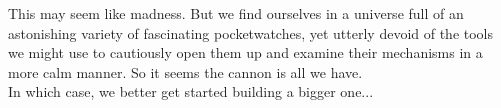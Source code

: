 This may seem like madness. But we find ourselves in a universe full of an astonishing variety of fascinating pocketwatches, yet utterly devoid of the tools we might use to cautiously open them up and examine their mechanisms in a more calm manner. So it seems the cannon is all we have. \\

In which case, we better get started building a bigger one...


%

